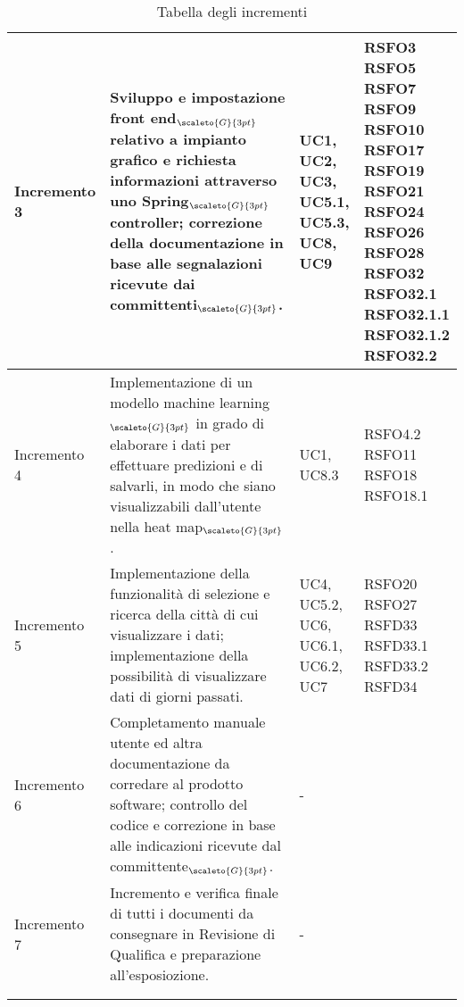 \begin{center}
\begin{longtable}[c]{p{4cm}|p{4cm}|p{4cm}|p{3cm}}
		\hline
		\centering Incremento 3 & \centering Sviluppo e impostazione front end$_{\scaleto{G}{3pt}}$ relativo a impianto grafico e richiesta informazioni attraverso uno Spring$_{\scaleto{G}{3pt}}$ controller; correzione della documentazione in base alle segnalazioni ricevute dai committenti$_{\scaleto{G}{3pt}}$. & \centering UC1, UC2, UC3, UC5.1, UC5.3, UC8, UC9 & \makecell[c]{RSFO3 \\ RSFO5\\ RSFO7 \\  RSFO9 \\ RSFO10 \\ RSFO17 \\ RSFO19 \\ RSFO21 \\ RSFO24 \\ RSFO26 \\ RSFO28 \\ RSFO32 \\ RSFO32.1 \\ RSFO32.1.1 \\ RSFO32.1.2 \\ RSFO32.2} \\
		\hline
		\centering Incremento 4 & \centering Implementazione di  un modello machine learning$_{\scaleto{G}{3pt}}$ in grado di elaborare i dati per effettuare predizioni e di salvarli, in modo che siano visualizzabili dall'utente nella heat map$_{\scaleto{G}{3pt}}$. & \centering UC1, UC8.3 & \makecell[c]{RSFO4.2 \\ RSFO11 \\ RSFO18 \\	RSFO18.1} \\
		\hline
		\centering Incremento 5 & \centering Implementazione della funzionalità di selezione e ricerca 
		della città di cui visualizzare i dati; implementazione della possibilità di visualizzare dati di giorni passati. & \centering UC4, UC5.2, UC6, UC6.1, UC6.2, UC7 & \makecell[c]{RSFO20 \\ RSFO27 \\ RSFD33 \\ RSFD33.1 \\ RSFD33.2 \\ RSFD34} \\
		\hline
		\centering Incremento 6 & \centering Completamento manuale utente ed altra documentazione da corredare al prodotto software; controllo del codice e correzione in base alle indicazioni ricevute dal committente$_{\scaleto{G}{3pt}}$. & \centering - & \makecell[c]{-} \\
		\hline
		\centering Incremento 7 & \centering Incremento e verifica finale di tutti i documenti da consegnare in Revisione di Qualifica e preparazione all'esposiozione. & \centering - & \makecell[c]{-} \\
		\hline
		\centering & \centering & \centering & \makecell[c]{} \\
		\hline
		\rowcolor{white}
		\caption[Nome caption]{Tabella degli incrementi}\label{qua va in base alle label di altre tabelle mi sa}
	\end{longtable}
\end{center}
